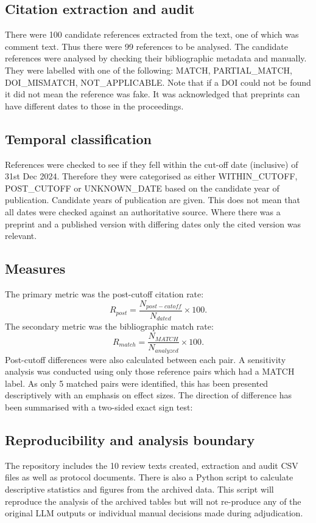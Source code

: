 \documentclass[manuscript]{acmart}
\begin{document}
\subsection{Citation extraction and audit}
There were 100 candidate references extracted from the text, one of which was comment text. Thus there were 99 references to be analysed. The candidate references were analysed by checking their bibliographic metadata and manually. They were labelled with one of the following: MATCH, PARTIAL\_MATCH, DOI\_MISMATCH, NOT\_APPLICABLE. Note that if a DOI could not be found it did not mean the reference was fake. It was acknowledged that preprints can have different dates to those in the proceedings.

\subsection{Temporal classification}
References were checked to see if they fell within the cut-off date (inclusive) of 31st Dec 2024. Therefore they were categorised as either WITHIN\_CUTOFF, POST\_CUTOFF or UNKNOWN\_DATE based on the candidate year of publication. Candidate years of publication are given. This does not mean that all dates were checked against an authoritative source. Where there was a preprint and a published version with differing dates only the cited version was relevant.

\subsection{Measures}
The primary metric was the post-cutoff citation rate:
\[
R_{post}=\frac{N_{post-cutoff}}{N_{dated}}\times 100.
\]
The secondary metric was the bibliographic match rate:
\[
R_{match}=\frac{N_{MATCH}}{N_{analyzed}}\times 100.
\]
Post-cutoff differences were also calculated between each pair. A sensitivity analysis was conducted using only those reference pairs which had a MATCH label. As only 5 matched pairs were identified, this has been presented descriptively with an emphasis on effect sizes. The direction of difference has been summarised with a two-sided exact sign test:

\subsection{Reproducibility and analysis boundary}

The repository includes the 10 review texts created, extraction and audit CSV files as well as protocol documents. There is also a Python script to calculate descriptive statistics and figures from the archived data. This script will reproduce the analysis of the archived tables but will not re-produce any of the original LLM outputs or individual manual decisions made during adjudication.
\end{document}
